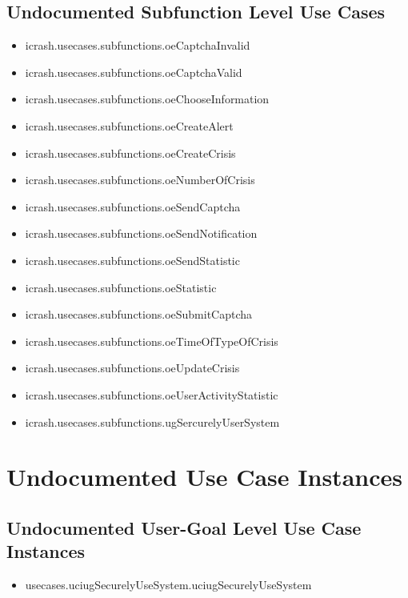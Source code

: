 \subsection[Undocumented Use Cases - Subfunction Level]{Undocumented Subfunction Level Use Cases}
\begin{itemize}
\item icrash.usecases.subfunctions.oeCaptchaInvalid 
\item icrash.usecases.subfunctions.oeCaptchaValid 
\item icrash.usecases.subfunctions.oeChooseInformation 
\item icrash.usecases.subfunctions.oeCreateAlert 
\item icrash.usecases.subfunctions.oeCreateCrisis 
\item icrash.usecases.subfunctions.oeNumberOfCrisis 
\item icrash.usecases.subfunctions.oeSendCaptcha 
\item icrash.usecases.subfunctions.oeSendNotification 
\item icrash.usecases.subfunctions.oeSendStatistic 
\item icrash.usecases.subfunctions.oeStatistic 
\item icrash.usecases.subfunctions.oeSubmitCaptcha 
\item icrash.usecases.subfunctions.oeTimeOfTypeOfCrisis 
\item icrash.usecases.subfunctions.oeUpdateCrisis 
\item icrash.usecases.subfunctions.oeUserActivityStatistic 
\item icrash.usecases.subfunctions.ugSercurelyUserSystem 
\end{itemize}





\section[Undocumented Use Case Instances]{Undocumented Use Case Instances}


\subsection[Undocumented Use Case Instances - User-Goal Level]{Undocumented User-Goal Level Use Case Instances}
\begin{itemize}
\item usecases.uciugSecurelyUseSystem.uciugSecurelyUseSystem 
\end{itemize}



